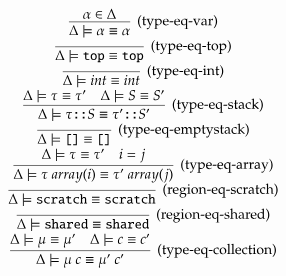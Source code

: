 \begin{equation*}
    \begin{array}{c}
        \infer[(\text{type-eq-var})]
            {\Delta \models \alpha \equiv \alpha}
            {\alpha \in \Delta}
        \\
        \infer[(\text{type-eq-top})]
            {\Delta \models \ttop \equiv \ttop}
            {}
        \\
        \infer[(\text{type-eq-int})]
            {\Delta \models int \equiv int}
            {}
        \\
        \infer[(\text{type-eq-stack})]
            {
                \Delta
                \models
                \tau \cons S
                \equiv
                \tau' \cons S'
            }
            {
                \Delta \models \tau \equiv \tau' &
                \Delta \models S \equiv S'
            }
        \\
        \infer[(\text{type-eq-emptystack})]
            {
                \Delta \models
                \emptystack \equiv \emptystack
            }
            { }
        \\
        \infer[(\text{type-eq-array})]
            {\Delta
            \models
            \tau\ array(i)
            \equiv
            \tau'\ array(j)}
            {\Delta \models \tau \equiv \tau' &
            i = j}
        \\
        \infer[(\text{region-eq-scratch})]
            {\Delta \models \scratch \equiv \scratch}
            {}
        \\
        \infer[(\text{region-eq-shared})]
            {\Delta \models \shared \equiv \shared}
            {}
        \\
        \infer[(\text{type-eq-collection})]
            {\Delta
            \models
            \mu\ c
            \equiv
            \mu'\ c'}
            {\Delta \models \mu \equiv \mu' &
            \Delta \models c \equiv c' }
        \\
    \end{array}
\end{equation*}
